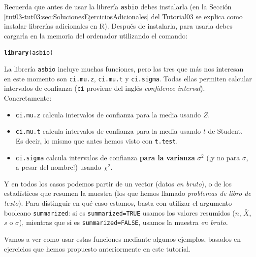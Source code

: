 \documentclass[10pt,a4paper]{article}\usepackage[]{graphicx}\usepackage[]{color}
\makeatletter
\newcommand{\hlstd}[1]{\textcolor[rgb]{0.345,0.345,0.345}{#1}}%
\newcommand{\hlkwd}[1]{\textcolor[rgb]{0.737,0.353,0.396}{\textbf{#1}}}%
\newenvironment{kframe}{%
 \def\at@end@of@kframe{}%
 \ifinner\ifhmode%
  \def\at@end@of@kframe{\end{minipage}}%
  \begin{minipage}{\columnwidth}%
 \fi\fi%
 \def\FrameCommand##1{\hskip\@totalleftmargin \hskip-\fboxsep
 \colorbox{shadecolor}{##1}\hskip-\fboxsep
     \hskip-\linewidth \hskip-\@totalleftmargin \hskip\columnwidth}%
 \MakeFramed {\advance\hsize-\width
   \@totalleftmargin\z@ \linewidth\hsize
   \@setminipage}}%
 {\par\unskip\endMakeFramed%
 \at@end@of@kframe}
\newenvironment{knitrout}{}{} %
\makeatother
\begin{document}
Recuerda que antes de usar la librería {\tt asbio} debes instalarla (en la Sección \ref{tut03-tut03:sec:SolucionesEjerciciosAdicionales} del Tutorial03 se explica como instalar librerías adicionales en R). Después de instalarla, para usarla debes cargarla en la memoria del ordenador  utilizando el comando:
\begin{knitrout}
\color{fgcolor}\begin{kframe}
\begin{alltt}
    \hlkwd{library}\hlstd{(asbio)}
\end{alltt}


{\ttfamily\noindent\itshape\color{messagecolor}{\#\# Loading required package: tcltk}}

{\ttfamily\noindent\color{warningcolor}{\#\# Warning: comando ejecutado ''/usr/bin/otool' -L '/Library/Frameworks/R.framework/Resources/library/tcltk/libs//tcltk.so'' tiene estatus 1}}\end{kframe}
\end{knitrout}
La librería {\tt asbio} incluye muchas funciones, pero las tres que más nos interesan en este momento son
{\tt ci.mu.z},   {\tt ci.mu.t} y {\tt  ci.sigma}. Todas ellas permiten calcular intervalos de confianza ({\tt ci} proviene del inglés {\em confidence interval}). Concretamente:
\begin{itemize}
  \item {\tt ci.mu.z} calcula intervalos de confianza  para la media usando $Z$.
  \item {\tt ci.mu.t} calcula intervalos de confianza  para la media usando $t$ de Student. Es decir, lo mismo que antes hemos visto con {\tt t.test}.
  \item {\tt ci.sigma} calcula intervalos de confianza {\bf para la varianza} $\sigma^2$  (¡y no para $\sigma$, a pesar del nombre!) usando $\chi^2$.
\end{itemize}
Y en todos los casos podemos partir de un vector (datos {\em en bruto}), o de los estadísticos que resumen la muestra (los que hemos llamado {\em problemas de libro de texto}). Para distinguir en qué caso estamos, basta con utilizar el argumento booleano {\tt summarized}: si es {\tt summarized=TRUE} usamos los valores resumidos ($n$, $\bar X$, $s$ o $\sigma$), mientras que si es {\tt summarized=FALSE}, usamos la muestra {\em en bruto}.

Vamos a ver como usar estas funciones mediante algunos ejemplos, basados en ejercicios que hemos propuesto anteriormente en este tutorial.
\end{document}
